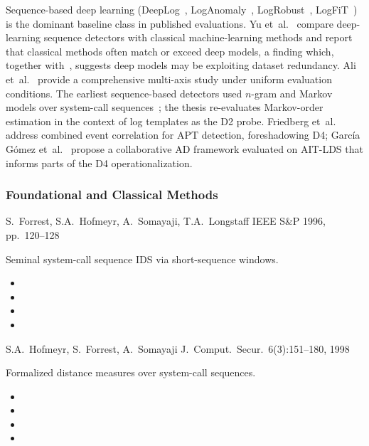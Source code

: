 Sequence-based deep learning (DeepLog~\cite{deeplog},
LogAnomaly~\cite{loganomaly}, LogRobust~\cite{logrobust},
LogFiT~\cite{logfit}) is the dominant baseline class in published
evaluations. Yu et~al.~\cite{yu2024dl} compare deep-learning sequence
detectors with classical machine-learning methods and report that
classical methods often match or exceed deep models, a finding which,
together with~\cite{landauer2024}, suggests deep models may be
exploiting dataset redundancy. Ali et~al.~\cite{ali2025} provide a
comprehensive multi-axis study under uniform evaluation conditions.
The earliest sequence-based detectors used $n$-gram and Markov models
over system-call sequences~\cite{forrest1996,hofmeyr1998}; the thesis
re-evaluates Markov-order estimation in the context of log templates as
the D2 probe. Friedberg et~al.~\cite{friedberg2015} address combined
event correlation for APT detection, foreshadowing D4; Garc\'ia
G\'omez et~al.~\cite{garcia2025} propose a collaborative AD framework
evaluated on AIT-LDS that informs parts of the D4 operationalization.

\subsubsection*{Foundational and Classical Methods}

{S.\ Forrest, S.A.\ Hofmeyr, A.\ Somayaji, T.A.\ Longstaff}
{IEEE S\&P 1996, pp.\ 120--128}
{Seminal system-call sequence IDS via short-sequence windows.
\begin{itemize}[nosep]
  \item {}
  \item {}
  \item {}
  \item {}
\end{itemize}}

{S.A.\ Hofmeyr, S.\ Forrest, A.\ Somayaji}
{J.\ Comput.\ Secur.\ 6(3):151--180, 1998}
{Formalized distance measures over system-call sequences.
\begin{itemize}[nosep]
  \item {}
  \item {}
  \item {}
  \item {}
\end{itemize}}

